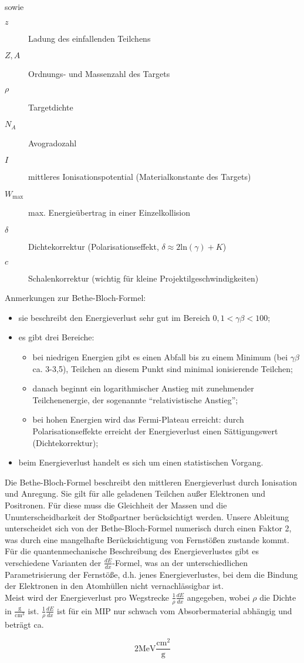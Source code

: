 sowie
\begin{description}
\item[$z$]Ladung des einfallenden Teilchens
\item[$Z, A$] Ordnungs- und Massenzahl des Targets
\item[$\rho$] Targetdichte
\item[$N_A$] Avogradozahl
\item[$I$] mittleres Ionisationspotential (Materialkonstante des Targets)
\item[$W_{\text{max}}$] max. Energieübertrag in einer Einzelkollision
\item[$\delta$] Dichtekorrektur (Polarisationseffekt, $\delta \approx 2\text{ln}(\gamma)+K$)
\item[$c$] Schalenkorrektur (wichtig für kleine Projektilgeschwindigkeiten)
\end{description}


Anmerkungen zur Bethe-Bloch-Formel:
\begin{itemize}
  \item sie beschreibt den Energieverlust sehr gut im Bereich $0,1 < \gamma\beta < 100$;
  \item es gibt drei Bereiche:
  			\begin{itemize}
  			  \item bei niedrigen Energien gibt es einen Abfall bis zu einem Minimum (bei $\gamma\beta$
  			  ca. 3-3,5), Teilchen an diesem Punkt sind minimal ionisierende Teilchen;
  			  \item danach beginnt ein logarithmischer Anstieg mit zunehmender Teilchenenergie, der
  			  sogenannte "`relativistische Anstieg"';
  			  \item bei hohen Energien wird das Fermi-Plateau erreicht: durch Polarisationseffekte erreicht
  			  der Energieverlust  einen Sättigungswert (Dichtekorrektur);
  			  \end{itemize}
  \item beim Energieverlust handelt es sich um einen statistischen Vorgang.
\end{itemize}

Die Bethe-Bloch-Formel beschreibt den mittleren Energieverlust durch Ionisation und Anregung. Sie
gilt für alle geladenen Teilchen außer Elektronen und Positronen. Für diese muss die Gleichheit der
Massen und die Ununterscheidbarkeit der Stoßpartner berücksichtigt werden. Unsere Ableitung
unterscheidet sich von der Bethe-Bloch-Formel numerisch durch einen Faktor 2, was durch eine
mangelhafte Berücksichtigung von Fernstößen zustande kommt. Für die quantenmechanische Beschreibung
des Energieverlustes gibt es verschiedene Varianten der $\frac{dE}{dx}$-Formel, was an der
unterschiedlichen Parametrisierung der Fernstöße, d.h. jenes Energieverlustes, bei dem die Bindung
der Elektronen in den Atomhüllen nicht vernachlässigbar ist.
\\
Meist wird der Energieverlust pro Wegstrecke $\frac{1}{\rho}\frac{dE}{dx}$ angegeben, wobei $\rho$
die Dichte in $\frac{\text{g}}{\text{cm}^3}$ ist. $\frac{1}{\rho}\frac{dE}{dx}$ ist für ein MIP nur
schwach vom Absorbermaterial abhängig und beträgt ca. 

\[2 \text{MeV}\frac{\text{cm}^2}{\text{g}}\]